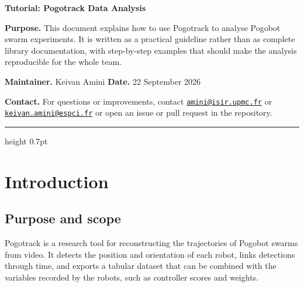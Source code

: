 \documentclass[11pt,a4paper]{article}
\begin{document}
\vspace*{6mm}
{\color{white}\fontsize{23}{29}\selectfont\textbf{Tutorial: Pogotrack Data Analysis}\par}
\vspace{19mm}

\begin{tcolorbox}[
  colback=PogoLight,
  colframe=PogoGreen,
  boxrule=0.7pt,
  arc=2mm,
  left=5mm,right=5mm,top=4mm,bottom=4mm
]
\raggedright
\textbf{Purpose.} This document explains how to use Pogotrack to analyse Pogobot swarm experiments. It is written as a practical guideline rather than as complete library documentation, with step-by-step examples that should make the analysis reproducible for the whole team.

\medskip
\textbf{Maintainer.} Keivan Amini \hfill \textbf{Date.} 22 September 2026

\medskip
\textbf{Contact.} For questions or improvements, contact \href{mailto:amini@isir.upmc.fr}{\texttt{amini@isir.upmc.fr}} or \href{mailto:keivan.amini@espci.fr}{\texttt{keivan.amini@espci.fr}} or open an issue or pull request in the repository.
\end{tcolorbox}

\thispagestyle{titlepage}

\tableofcontents
\vspace{0.5em}
\hrule height 0.7pt
\vspace{0.8em}

\section{Introduction}

\subsection{Purpose and scope}

Pogotrack is a research tool for reconstructing the trajectories of Pogobot swarms from video. It detects the position and orientation of each robot, links detections through time, and exports a tabular dataset that can be combined with the variables recorded by the robots, such as controller scores and weights.
\end{document}
